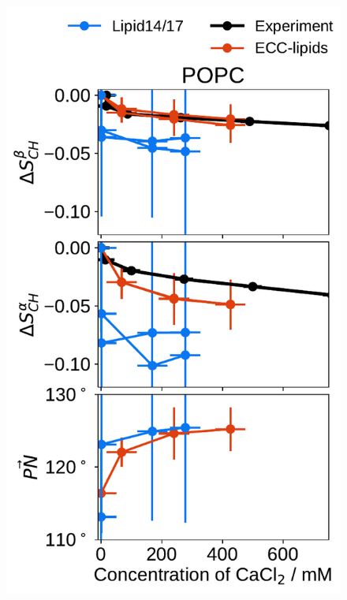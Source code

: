 \begin{figure}[htb!] 
  \centering 
  \includegraphics[width=\figwidthsmall]{../img/ecc_pops/order_parameters_changes_ecc-lip_L14_A-B-PN-COO_POPC_cacl.pdf} 

\end{figure}
